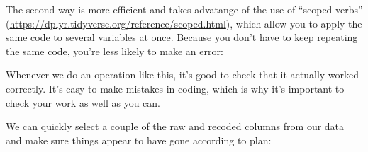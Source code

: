 \documentclass[12pt,]{book}
\newenvironment{Shaded}{\begin{snugshade}}{\end{snugshade}}
\newcommand{\CommentTok}[1]{\textcolor[rgb]{0.56,0.35,0.01}{\textit{#1}}}
\newcommand{\DataTypeTok}[1]{\textcolor[rgb]{0.13,0.29,0.53}{#1}}
\newcommand{\DecValTok}[1]{\textcolor[rgb]{0.00,0.00,0.81}{#1}}
\newcommand{\KeywordTok}[1]{\textcolor[rgb]{0.13,0.29,0.53}{\textbf{#1}}}
\newcommand{\NormalTok}[1]{#1}
\newcommand{\OperatorTok}[1]{\textcolor[rgb]{0.81,0.36,0.00}{\textbf{#1}}}
\newcommand{\StringTok}[1]{\textcolor[rgb]{0.31,0.60,0.02}{#1}}
\begin{document}
The second way is more efficient and takes advatange of the use of ``scoped verbs'' (\url{https://dplyr.tidyverse.org/reference/scoped.html}), which allow you to apply the same code to several variables at once. Because you don't have to keep repeating the same code, you're less likely to make an error:

\begin{Shaded}
\end{Shaded}

Whenever we do an operation like this, it's good to check that it actually worked correctly. It's easy to make mistakes in coding, which is why it's important to check your work as well as you can.

We can quickly select a couple of the raw and recoded columns from our data and make sure things appear to have gone according to plan:

\begin{Shaded}
\end{Shaded}
\end{document}

